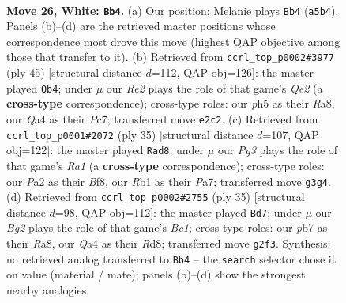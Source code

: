 \documentclass[11pt]{article}
\begin{document}
\clearpage

\begin{figure}[p]\centering
\begin{subfigure}{0.46\textwidth}\centering
\resizebox{\linewidth}{!}{%
\newchessgame
\chessboard[
  setfen={r1bn1k2/1ppp1pp1/p2q4/B2Pr1np/Q6N/4P1P1/PP2RPBP/1R4K1 w - - 0 26},
  showmover=false,
  pgfstyle=straightmove, color=movearrow, markmove={a5-b4}
]}
\caption{}
\end{subfigure}\hfill
\begin{subfigure}{0.46\textwidth}\centering
\resizebox{\linewidth}{!}{%
\newchessgame
\chessboard[
  setfen={r1b1r1k1/1pp1qp1p/1n4p1/1P2p3/2P1Q3/pN2P2P/P2RBPP1/2R3K1 b - - 4 23},
  showmover=false,
  pgfstyle=straightmove, color=movearrow, markmove={e7-b4}
]}
\caption{}
\end{subfigure}
\\[4pt]
\begin{subfigure}{0.46\textwidth}\centering
\resizebox{\linewidth}{!}{%
\newchessgame
\chessboard[
  setfen={r3rbk1/p1q3pp/2p2p2/P1pnp3/2N5/2PP2Q1/1P3PPP/R1B1R1K1 b - - 0 18},
  showmover=false,
  pgfstyle=straightmove, color=movearrow, markmove={a8-d8}
]}
\caption{}
\end{subfigure}\hfill
\begin{subfigure}{0.46\textwidth}\centering
\resizebox{\linewidth}{!}{%
\newchessgame
\chessboard[
  setfen={r1br2k1/1p2qpb1/2p1p1p1/p6p/2RPQ2P/1B2PN2/PP3PP1/2R3K1 b - - 3 18},
  showmover=false,
  pgfstyle=straightmove, color=movearrow, markmove={c8-d7}
]}
\caption{}
\end{subfigure}
\caption{\textbf{Move 26, White: \texttt{Bb4}.} (a) Our position; Melanie plays \texttt{Bb4} (\texttt{a5b4}). Panels (b)--(d) are the retrieved master positions whose correspondence most drove this move (highest QAP objective among those that transfer to it). (b) Retrieved from \texttt{ccrl\_top\_p0002\#3977} (ply 45) [structural distance $d$=112, QAP obj=126]: the master played \texttt{Qb4}; under $\mu$ our \emph{Re2} plays the role of that game's \emph{Qe2} (a \textbf{cross-type} correspondence); cross-type roles: our \emph{p}h5 as their \emph{R}a8, our \emph{Q}a4 as their \emph{P}c7; transferred move \texttt{e2c2}. (c) Retrieved from \texttt{ccrl\_top\_p0001\#2072} (ply 35) [structural distance $d$=107, QAP obj=122]: the master played \texttt{Rad8}; under $\mu$ our \emph{Pg3} plays the role of that game's \emph{Ra1} (a \textbf{cross-type} correspondence); cross-type roles: our \emph{P}a2 as their \emph{B}f8, our \emph{R}b1 as their \emph{P}a7; transferred move \texttt{g3g4}. (d) Retrieved from \texttt{ccrl\_top\_p0002\#2755} (ply 35) [structural distance $d$=98, QAP obj=112]: the master played \texttt{Bd7}; under $\mu$ our \emph{Bg2} plays the role of that game's \emph{Bc1}; cross-type roles: our \emph{p}b7 as their \emph{R}a8, our \emph{Q}a4 as their \emph{R}d8; transferred move \texttt{g2f3}. Synthesis: no retrieved analog transferred to \texttt{Bb4} -- the \texttt{search} selector chose it on value (material / mate); panels (b)--(d) show the strongest nearby analogies.}
\label{fig:thought-m50}
\end{figure}
\end{document}
